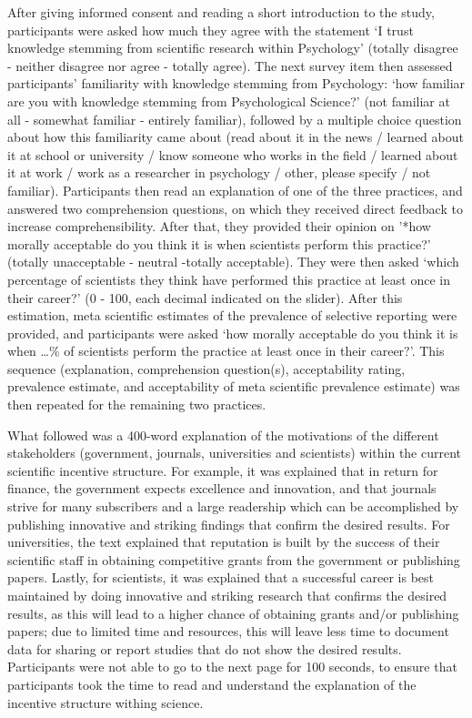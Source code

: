 \documentclass[
  man,floatsintext]{apa7}
\begin{document}
After giving informed consent and reading a short introduction to the
study, participants were asked how much they agree with the statement `I
trust knowledge stemming from scientific research within Psychology'
(totally disagree - neither disagree nor agree - totally agree). The next survey item then
assessed participants' familiarity with knowledge stemming from Psychology:
`how familiar are you with knowledge stemming from Psychological
Science?' (not familiar at all - somewhat familiar - entirely familiar),
followed by a multiple choice question about how this familiarity came
about (read about it in the news / learned about it at school or university /
know someone who works in the field / learned about it at work / work as a researcher in psychology / other, please specify / not familiar). Participants then read an explanation of
one of the three practices, and answered two comprehension questions, on which they received direct feedback to increase comprehensibility. After that, they provided their opinion on '*how morally acceptable do you think it is
when scientists perform this practice?' (totally unacceptable - neutral -totally acceptable). They were then asked `which percentage of scientists they think have performed this practice at least once in their career?' (0 - 100, each decimal indicated on the slider). After this estimation, meta scientific estimates of the prevalence of selective
reporting were provided, and participants were asked `how morally acceptable do you think it is when \ldots\% of scientists perform the practice at least once in their career?'. This sequence (explanation, comprehension
question(s), acceptability rating, prevalence estimate, and acceptability of meta scientific prevalence estimate) was then repeated for the remaining two practices.

What followed was a 400-word explanation of the motivations of the different stakeholders (government, journals,
universities and scientists) within the current scientific incentive
structure. For example, it was explained that in return for finance, the
government expects excellence and innovation, and that journals
strive for many subscribers and a large readership which can be
accomplished by publishing innovative and striking findings that confirm
the desired results. For universities, the text explained that reputation
is built by the success of their scientific staff in obtaining
competitive grants from the government or publishing papers. Lastly, for
scientists, it was explained that a successful career is best maintained
by doing innovative and striking research that confirms the desired
results, as this will lead to a higher chance of obtaining grants and/or
publishing papers; due to limited time and resources, this will leave
less time to document data for sharing or report studies that do not
show the desired results. Participants were not able to go to the next page for 100 seconds, to ensure that participants took the time to read and understand the explanation of the incentive structure withing science.
\end{document}
